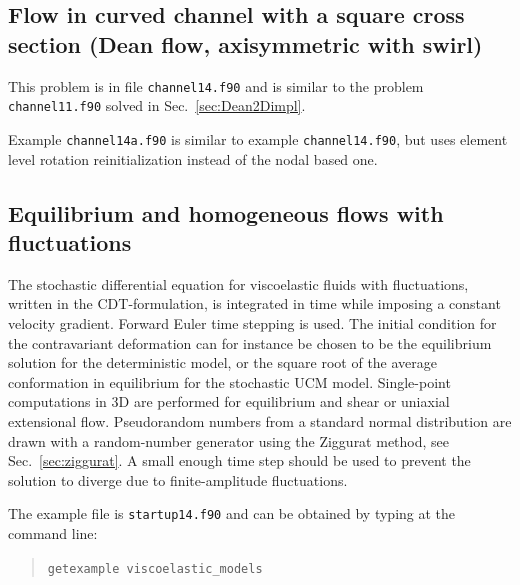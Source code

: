 \subsection{Flow in curved channel with a square cross section (Dean flow, axisymmetric with swirl)} 
\label{sec:Dean2Dimplbten}

This problem is in file \texttt{channel14.f90} and is similar to the problem \texttt{channel11.f90} solved in Sec.~\ref{sec:Dean2Dimpl}. 

Example \texttt{channel14a.f90} is similar to example \texttt{channel14.f90}, but uses element level rotation reinitialization instead of the nodal based one.

\subsection{Equilibrium and homogeneous flows with fluctuations}
\label{sec:startup_b_fluct}

The stochastic differential equation for viscoelastic fluids with fluctuations, 
written in the CDT-formulation, is integrated in time while imposing a constant 
velocity gradient. Forward Euler time stepping is used. The initial condition 
for the contravariant deformation can for instance be chosen to be the 
equilibrium solution for the deterministic model, or the square root of the
average conformation in equilibrium for the stochastic UCM model. Single-point
computations in 3D are performed for equilibrium and shear or uniaxial
extensional flow. Pseudorandom numbers from a standard normal distribution are
drawn with a random-number generator using the Ziggurat method, 
see Sec.~\ref{sec:ziggurat}. A small enough time step should be used to prevent 
the solution to diverge due to finite-amplitude fluctuations.

The example file is \texttt{startup14.f90} and can be obtained by typing at the
command line:
\medskip
\begin{quote}
   \texttt{getexample viscoelastic\_models}
\end{quote}

